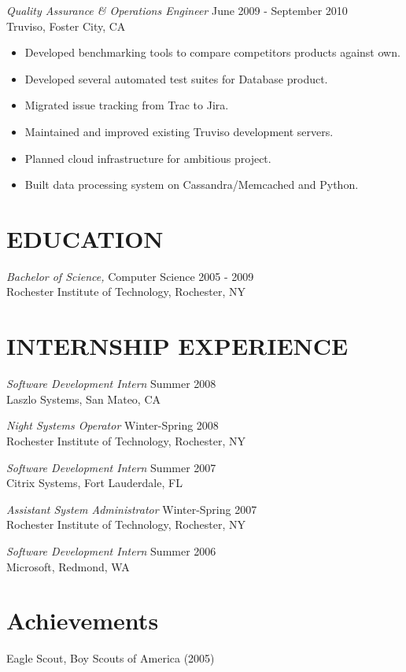 \documentclass[line,margin]{res}
\begin{document}
\begin{resume}
                {\sl Quality Assurance \& Operations Engineer} \hfill June 2009 - September 2010 \\
                Truviso, Foster City, CA
                \begin{itemize}  \itemsep -2pt %
                 \item Developed benchmarking tools to compare competitors products against own.
                 \item Developed several automated test suites for Database product.
                 \item Migrated issue tracking from Trac to Jira.
                 \item Maintained and improved existing Truviso development servers.
                 \item Planned cloud infrastructure for ambitious project.
                 \item Built data processing system on Cassandra/Memcached and Python.
                \end{itemize}
                
\section{EDUCATION} {\sl Bachelor of Science,} Computer Science \hfill    2005 - 2009 \\
                Rochester Institute of Technology, Rochester, NY
                
\section{INTERNSHIP EXPERIENCE}
                
                {\sl Software Development Intern} \hfill        Summer 2008 \\
                Laszlo Systems, San Mateo, CA
                
                {\sl Night Systems Operator} \hfill        Winter-Spring 2008 \\
                Rochester Institute of Technology, Rochester, NY
                
                {\sl Software Development Intern} \hfill        Summer 2007 \\
                Citrix Systems, Fort Lauderdale, FL
                
                {\sl Assistant System Administrator} \hfill        Winter-Spring 2007 \\
                Rochester Institute of Technology,  Rochester, NY
                
                {\sl Software Development Intern} \hfill          Summer 2006 \\
                Microsoft, Redmond, WA
           
\section{Achievements}             
            Eagle Scout, Boy Scouts of America (2005) \\
 
\end{resume}
\end{document}
